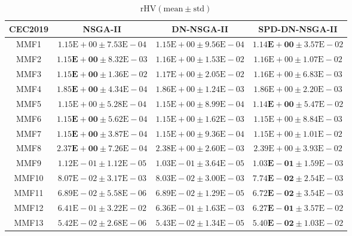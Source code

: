 \begin{table}[htbp]
	\scriptsize
	\centering
	\caption{$\text{rHV} (\text{mean} \pm \text{std})$}\label{tab: rHV}
	\begin{tabular}{cccc}
		\toprule
		CEC2019 & NSGA-II & DN-NSGA-II & SPD-DN-NSGA-II \\
		\midrule
		MMF1 & $1.15\text{E}+00 \pm 7.53\text{E}-04$ & $1.15\text{E}+00 \pm 9.56\text{E}-04$ & $\mathbf{1.14\text{E}+00} \pm 3.57\text{E}-02$\\
		MMF2 & $\mathbf{1.15\text{E}+00} \pm 8.32\text{E}-03$ & $1.16\text{E}+00 \pm 1.53\text{E}-02$ & $1.16\text{E}+00 \pm 1.07\text{E}-02$\\
		MMF3 & $\mathbf{1.15\text{E}+00} \pm 1.36\text{E}-02$ & $1.17\text{E}+00 \pm 2.05\text{E}-02$ & $1.16\text{E}+00 \pm 6.83\text{E}-03$\\
		MMF4 & $\mathbf{1.85\text{E}+00} \pm 4.34\text{E}-04$ & $1.86\text{E}+00 \pm 1.24\text{E}-03$ & $1.86\text{E}+00 \pm 2.20\text{E}-03$\\
		MMF5 & $1.15\text{E}+00 \pm 5.28\text{E}-04$ & $1.15\text{E}+00 \pm 8.99\text{E}-04$ & $\mathbf{1.14\text{E}+00} \pm 5.47\text{E}-02$\\
		MMF6 & $\mathbf{1.15\text{E}+00} \pm 5.62\text{E}-04$ & $1.15\text{E}+00 \pm 1.62\text{E}-03$ & $1.15\text{E}+00 \pm 8.84\text{E}-03$\\
		MMF7 & $\mathbf{1.15\text{E}+00} \pm 3.87\text{E}-04$ & $1.15\text{E}+00 \pm 9.36\text{E}-04$ & $1.15\text{E}+00 \pm 1.01\text{E}-02$\\
		MMF8 & $\mathbf{2.37\text{E}+00} \pm 7.26\text{E}-04$ & $2.38\text{E}+00 \pm 2.60\text{E}-03$ & $2.39\text{E}+00 \pm 3.93\text{E}-02$\\
		MMF9 & $1.12\text{E}-01 \pm 1.12\text{E}-05$ & $1.03\text{E}-01 \pm 3.64\text{E}-05$ & $\mathbf{1.03\text{E}-01} \pm 1.59\text{E}-03$\\
		MMF10 & $8.07\text{E}-02 \pm 3.17\text{E}-03$ & $8.03\text{E}-02 \pm 3.00\text{E}-03$ & $\mathbf{7.74\text{E}-02} \pm 2.54\text{E}-03$\\
		MMF11 & $6.89\text{E}-02 \pm 5.58\text{E}-06$ & $6.89\text{E}-02 \pm 1.29\text{E}-05$ & $\mathbf{6.72\text{E}-02} \pm 3.54\text{E}-03$\\
		MMF12 & $6.41\text{E}-01 \pm 3.22\text{E}-02$ & $6.36\text{E}-01 \pm 1.63\text{E}-03$ & $\mathbf{6.27\text{E}-01} \pm 3.57\text{E}-02$\\
		MMF13 & $5.42\text{E}-02 \pm 2.68\text{E}-06$ & $5.43\text{E}-02 \pm 1.34\text{E}-05$ & $\mathbf{5.40\text{E}-02} \pm 1.03\text{E}-02$\\

\end{tabular}
\end{table}
